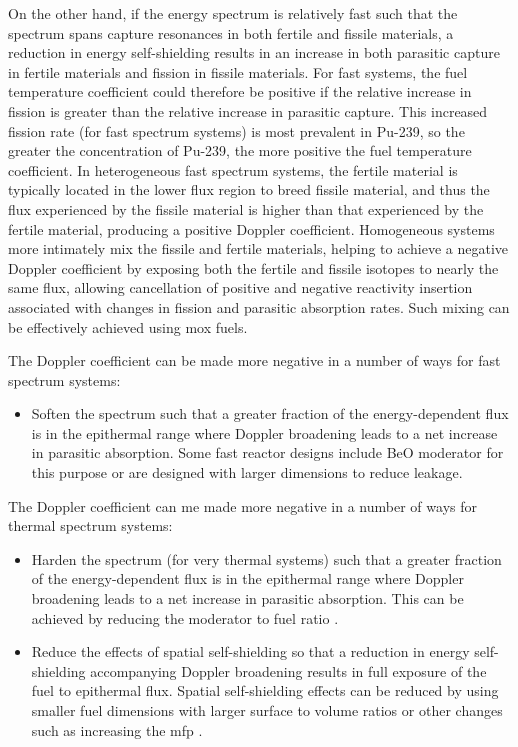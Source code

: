On the other hand, if the energy spectrum is relatively fast such that the spectrum spans capture resonances in both fertile and fissile materials, a reduction in energy self-shielding results in an increase in both parasitic capture in fertile materials and fission in fissile materials. For fast systems, the fuel temperature coefficient could therefore be positive if the relative increase in fission is greater than the relative increase in parasitic capture. This increased fission rate (for fast spectrum systems) is most prevalent in Pu-239, so the greater the concentration of Pu-239, the more positive the fuel temperature coefficient. In heterogeneous fast spectrum systems, the fertile material is typically located in the lower flux region to breed fissile material, and thus the flux experienced by the fissile material is higher than that experienced by the fertile material, producing a positive Doppler coefficient. Homogeneous systems more intimately mix the fissile and fertile materials, helping to achieve a negative Doppler coefficient by exposing both the fertile and fissile isotopes to nearly the same flux, allowing cancellation of positive and negative reactivity insertion associated with changes in fission and parasitic absorption rates. Such mixing can be effectively achieved using \gls{mox} fuels. 

The Doppler coefficient can be made more negative in a number of ways for fast spectrum systems:

\begin{itemize}
\item Soften the spectrum such that a greater fraction of the energy-dependent flux is in the epithermal range where Doppler broadening leads to a net increase in parasitic absorption. Some fast reactor designs include BeO moderator for this purpose or are designed with larger dimensions to reduce leakage.
\end{itemize}

The Doppler coefficient can me made more negative in a number of ways for thermal spectrum systems:

\begin{itemize}
\item Harden the spectrum (for very thermal systems) such that a greater fraction of the energy-dependent flux is in the epithermal range where Doppler broadening leads to a net increase in parasitic absorption. This can be achieved by reducing the moderator to fuel ratio \cite{fratoni}.
\item Reduce the effects of spatial self-shielding so that a reduction in energy self-shielding accompanying Doppler broadening results in full exposure of the fuel to epithermal flux. Spatial self-shielding effects can be reduced by using smaller fuel dimensions with larger surface to volume ratios \cite{fratoni} or other changes such as increasing the \gls{mfp} \cite{duderstadt}.
\end{itemize}

